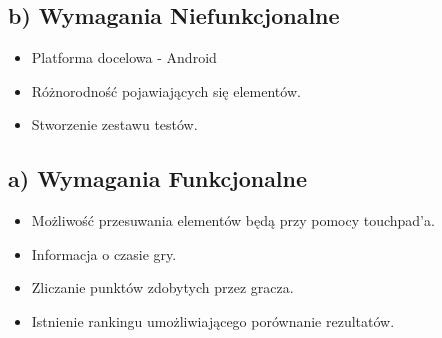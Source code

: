 \documentclass[a4paper,12pt]{article}
\begin{document}
	\subsection*{b) Wymagania Niefunkcjonalne}
	\begin{itemize}
		\item Platforma docelowa - Android
		\item Różnorodność pojawiających się elementów.
		\item Stworzenie zestawu testów.
	\end{itemize}
   		
	\subsection*{a) Wymagania Funkcjonalne}
	\begin{itemize}
		\item Możliwość przesuwania elementów będą przy pomocy touchpad'a.
		\item Informacja o czasie gry.
		\item Zliczanie punktów zdobytych przez gracza.
		\item Istnienie rankingu umożliwiającego porównanie rezultatów.
	\end{itemize}
\end{document}

